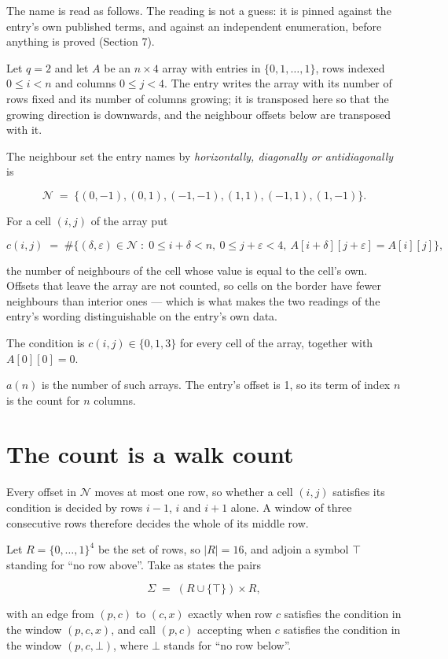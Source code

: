\documentclass[11pt]{article}
\theoremstyle{definition}
\begin{document}
The name is read as follows. The reading is not a guess: it is pinned against the entry's own published terms, and against an independent enumeration, before anything is proved (Section 7).

Let $q = 2$ and let $A$ be an $n \times 4$ array with entries in $\{0,1,\dots,1\}$, rows indexed $0 \le i < n$ and columns $0 \le j < 4$. The entry writes the array with its number of rows fixed and its number of columns growing; it is transposed here so that the growing direction is downwards, and the neighbour offsets below are transposed with it.

The neighbour set the entry names by {\itshape horizontally, diagonally or antidiagonally} is

\[\mathcal{N} \;=\; \{(0,-1), (0,1), (-1,-1), (1,1), (-1,1), (1,-1)\}.\]

For a cell $(i,j)$ of the array put

\[c(i,j) \;=\; \#\bigl\{(\delta,\varepsilon)\in\mathcal{N} \;:\; 0\le i+\delta<n,\ 0\le j+\varepsilon<4,\ A[i+\delta][j+\varepsilon] = A[i][j]\bigr\},\]

the number of neighbours of the cell whose value is equal to the cell's own. Offsets that leave the array are not counted, so cells on the border have fewer neighbours than interior ones --- which is what makes the two readings of the entry's wording distinguishable on the entry's own data.

The condition is $c(i,j) \in \{0, 1, 3\}$ for every cell of the array, together with $A[0][0]=0$.

$a(n)$ is the number of such arrays. The entry's offset is 1, so its term of index $n$ is the count for $n$ columns.

\section{The count is a walk count}

Every offset in $\mathcal{N}$ moves at most one row, so whether a cell $(i,j)$ satisfies its condition is decided by rows $i-1$, $i$ and $i+1$ alone. A window of three consecutive rows therefore decides the whole of its middle row.

Let $R = \{0,\dots,1\}^{4}$ be the set of rows, so $|R| = 16$, and adjoin a symbol $\top$ standing for ``no row above''. Take as states the pairs

\[\Sigma \;=\; (R \cup \{\top\}) \times R,\]

with an edge from $(p,c)$ to $(c,x)$ exactly when row $c$ satisfies the condition in the window $(p,c,x)$, and call $(p,c)$ accepting when $c$ satisfies the condition in the window $(p,c,\bot)$, where $\bot$ stands for ``no row below''.
\end{document}
